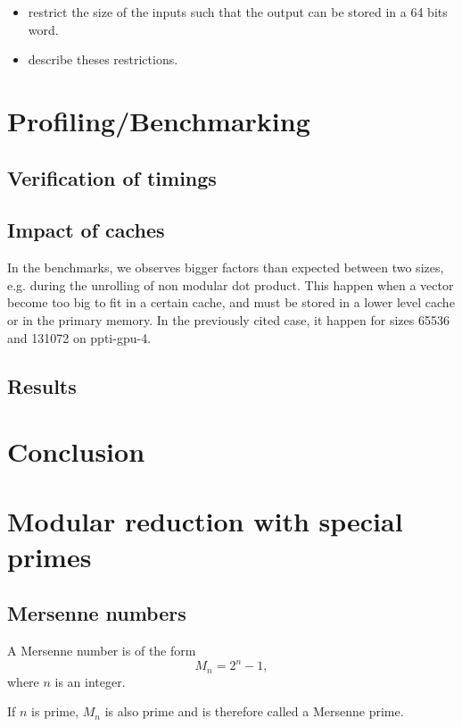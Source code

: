 \documentclass[a4paper]{article}
\begin{document}
\begin{itemize}
    \item restrict the size of the inputs such that the output can be stored in a 64 bits word.
    \item describe theses restrictions.
\end{itemize}


\section{Profiling/Benchmarking}



\subsection{Verification of timings}

\subsection{Impact of caches} %

In the benchmarks, we observes bigger factors than expected between two sizes,
e.g. during the unrolling of non modular dot product. This happen when a vector
become too big to fit in a certain cache, and must be stored in a lower level
cache or in the primary memory. In the previously cited case, it happen for sizes
65536 and 131072 on ppti-gpu-4. %


\subsection{Results}

\section{Conclusion}

\section{Modular reduction with special primes}

\subsection{Mersenne numbers}

\begin{definition}
    A Mersenne number is of the form $$ M_n = 2^n-1,$$ where $n$ is an integer.

    If $n$ is prime, $M_n$ is also prime and is therefore called a Mersenne prime.
\end{definition}
\end{document}
